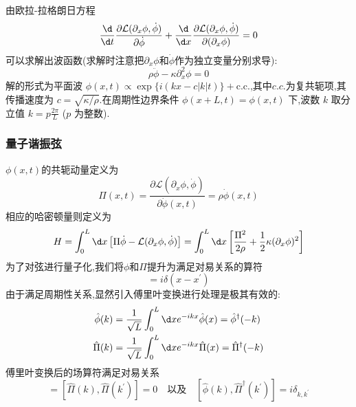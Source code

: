 由欧拉-拉格朗日方程
\begin{equation}
    \frac{\d}{\d t}\frac{\partial\mathcal{L}(\partial_x\phi,\dot{\phi})}{\partial\dot{\phi}}+\frac{\d}{\d x}\frac{\partial\mathcal{L}(\partial_x\phi,\dot{\phi})}{\partial(\partial_x\phi)}=0
\end{equation}
可以求解出波函数(求解时注意把$\partial_x\phi$和$\dot \phi$作为独立变量分别求导):
\begin{equation}
    \rho\ddot{\phi}-\kappa\partial_x^2\phi=0
\end{equation}
解的形式为平面波 $\phi(x,t) \propto \exp\{i(kx - c|k|t)\} + \text{c.c.}$,其中$c.c.$为复共轭项,其传播速度为 $c = \sqrt{\kappa/\rho}$.在周期性边界条件 $\phi(x+L,t) = \phi(x,t)$ 下,波数 $k$ 取分立值 $k = p\frac{2\pi}{L}$ ($p$ 为整数).

\subsubsection{量子谐振弦}
$\phi(x,t)$的共轭动量定义为
\begin{equation}
    \Pi(x,t)=\frac{\partial\mathcal{L}(\partial_x\phi,\dot{\phi})}{\partial\dot{\phi}(x,t)}=\rho\dot{\phi}(x,t)
\end{equation}
相应的哈密顿量则定义为
\begin{equation}
    H=\int_0^L\d x\left[\Pi\dot{\phi}-\mathcal{L}(\partial_x\phi,\dot{\phi})\right]=\int_0^L\d x\left[\frac{\Pi^2}{2\rho}+\frac{1}{2}\kappa(\partial_x\phi)^2\right]
\end{equation}
为了对弦进行量子化,我们将$\phi$和$\Pi$提升为满足对易关系的算符
\begin{equation}
    [\hat{\phi}(x),\hat{\Pi}(x^{\prime})]=i\delta(x-x^{\prime})
\end{equation}
由于满足周期性关系,显然引入傅里叶变换进行处理是极其有效的:
\begin{equation}
    \begin{aligned}
        \hat{\phi}(k)&=\frac{1}{\sqrt{L}}\int_0^L\d xe^{-ikx}\hat{\phi}(x)=\hat{\phi}^\dagger(-k)\\
        \hat{\Pi}(k)&=\frac{1}{\sqrt{L}}\int_0^L\d xe^{-ikx}\hat{\Pi}(x)=\hat{\Pi}^\dagger(-k)
    \end{aligned}
\end{equation}
傅里叶变换后的场算符满足对易关系
\begin{equation}
    [\hat{\phi}(k),\hat{\phi}(k^{\prime})]=[\hat{\Pi}(k),\hat{\Pi}(k^{\prime})]=0\quad\text{以及}\quad[\hat{\phi}(k),\hat{\Pi}^\dagger(k^{\prime})]=i\delta_{k,k^{\prime}}
\end{equation}

